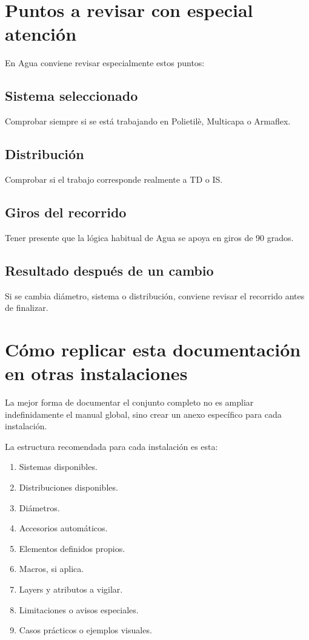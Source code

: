 \documentclass[12pt,a4paper]{article}
\begin{document}
\section{Puntos a revisar con especial atención}

En Agua conviene revisar especialmente estos puntos:

\subsection{Sistema seleccionado}

Comprobar siempre si se está trabajando en Polietilè, Multicapa o Armaflex.

\subsection{Distribución}

Comprobar si el trabajo corresponde realmente a TD o IS.

\subsection{Giros del recorrido}

Tener presente que la lógica habitual de Agua se apoya en giros de 90 grados.

\subsection{Resultado después de un cambio}

Si se cambia diámetro, sistema o distribución, conviene revisar el recorrido antes de finalizar.

\section{Cómo replicar esta documentación en otras instalaciones}

La mejor forma de documentar el conjunto completo no es ampliar indefinidamente el manual global, sino crear un anexo específico para cada instalación.

La estructura recomendada para cada instalación es esta:

\begin{enumerate}
\item Sistemas disponibles.
\item Distribuciones disponibles.
\item Diámetros.
\item Accesorios automáticos.
\item Elementos definidos propios.
\item Macros, si aplica.
\item Layers y atributos a vigilar.
\item Limitaciones o avisos especiales.
\item Casos prácticos o ejemplos visuales.
\end{enumerate}
\end{document}
